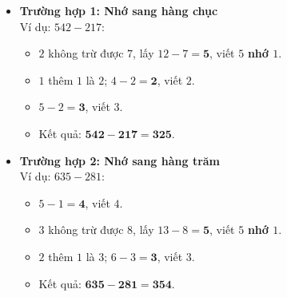 \documentclass[10pt,a4paper]{article}
\begin{document}
\begin{minipage}[t]{0.49\textwidth}\vspace{0pt}
\begin{tcolorbox}[
  enhanced,
  colback=teal!4!white,
  colframe=teal!75!black,
  arc=2mm, boxrule=0.8pt,
  left=2mm, right=2mm, top=1.8mm, bottom=1.8mm,
  title={\footnotesize\bfseries\color{white}\faSliders\ 2. Hai trường hợp có nhớ điển hình}
]
{\footnotesize
\begin{itemize}\setlength{\itemsep}{1pt}\setlength{\leftskip}{-2.5mm}
  \item \textbf{Trường hợp 1: Nhớ sang hàng chục}\\
  Ví dụ: $542 - 217$:
  \begin{itemize}\setlength{\itemsep}{0.5pt}\setlength{\leftskip}{-2mm}
    \item $2$ không trừ được $7$, lấy $12 - 7 = \mathbf{5}$, viết $5$ \textbf{nhớ $1$}.
    \item $1$ thêm $1$ là $2$; $4 - 2 = \mathbf{2}$, viết $2$.
    \item $5 - 2 = \mathbf{3}$, viết $3$.
    \item Kết quả: $\mathbf{542 - 217 = 325}$.
  \end{itemize}
  \item \textbf{Trường hợp 2: Nhớ sang hàng trăm}\\
  Ví dụ: $635 - 281$:
  \begin{itemize}\setlength{\itemsep}{0.5pt}\setlength{\leftskip}{-2mm}
    \item $5 - 1 = \mathbf{4}$, viết $4$.
    \item $3$ không trừ được $8$, lấy $13 - 8 = \mathbf{5}$, viết $5$ \textbf{nhớ $1$}.
    \item $2$ thêm $1$ là $3$; $6 - 3 = \mathbf{3}$, viết $3$.
    \item Kết quả: $\mathbf{635 - 281 = 354}$.
  \end{itemize}
\end{itemize}
}
\end{tcolorbox}
\end{minipage}
\end{document}
